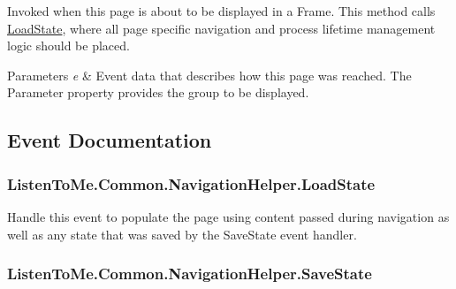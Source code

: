Invoked when this page is about to be displayed in a Frame. This method calls \hyperlink{class_listen_to_me_1_1_common_1_1_navigation_helper_a8179285cdfdfeb3a5b80f2e6c8150743}{Load\+State}, where all page specific navigation and process lifetime management logic should be placed. 


\begin{DoxyParams}{Parameters}
{\em e} & Event data that describes how this page was reached. The Parameter property provides the group to be displayed.\\
\hline
\end{DoxyParams}


\subsection{Event Documentation}
\subsubsection[{\texorpdfstring{Load\+State}{LoadState}}]{ Listen\+To\+Me.\+Common.\+Navigation\+Helper.\+Load\+State}\hypertarget{class_listen_to_me_1_1_common_1_1_navigation_helper_a8179285cdfdfeb3a5b80f2e6c8150743}{}\label{class_listen_to_me_1_1_common_1_1_navigation_helper_a8179285cdfdfeb3a5b80f2e6c8150743}


Handle this event to populate the page using content passed during navigation as well as any state that was saved by the Save\+State event handler. 

\subsubsection[{\texorpdfstring{Save\+State}{SaveState}}]{ Listen\+To\+Me.\+Common.\+Navigation\+Helper.\+Save\+State}\hypertarget{class_listen_to_me_1_1_common_1_1_navigation_helper_a63888f37f25238442c4f5f68af554541}{}\label{class_listen_to_me_1_1_common_1_1_navigation_helper_a63888f37f25238442c4f5f68af554541}


